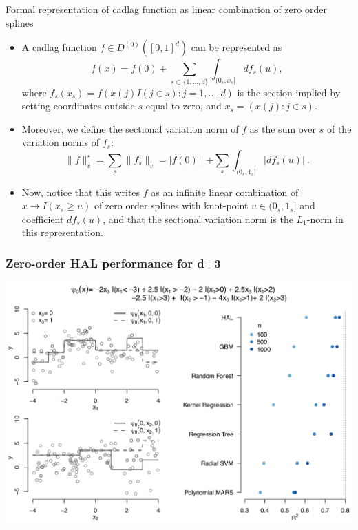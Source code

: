 \documentclass[t]{beamer}
\begin{document}
\begin{frame}{Formal representation of cadlag function as linear combination of zero order splines}
\begin{itemize}
\item A cadlag function $f\in D^{(0)}([0,1]^d)$ can be represented as
\[
f(x)=f(0)+\sum_{s\subset\{1,\ldots,d\}}\int_{(0_s,x_s]}df_s(u),\]
where $f_s(x_s)=f(x(j)I(j\in s): j=1,\ldots,d)$ is the section implied by setting coordinates outside $s$ equal to zero, and $x_s=(x(j): j\in s)$.
\item Moreover, we define the sectional variation norm of $f$ as the sum over $s$ of the variation norms of $f_s$:
\[
\lVert f\rVert_v^{\star}=\sum_s \lVert f_s \rVert_v=\mid f(0)\mid +\sum_s
\int_{(0_s,1_s]}\lvert df_s(u)\rvert \ .
\]
\end{itemize}
\end{frame}
\begin{frame}
\begin{itemize}
\item Now, notice that this writes $f$ as an infinite linear combination of $x\rightarrow I(x_s\geq u)$ of zero order splines with knot-point $u\in (0_s,1_s]$ and coefficient $df_s(u)$, and that the sectional variation norm is the $L_1$-norm in this representation.
\end{itemize}
\end{frame}

\begin{frame}
\frametitle{Zero-order HAL performance for d=3}
  \vspace{-10pt}
  \begin{center}
  \includegraphics[width = 1\textwidth]{figures/HALworks.png}
  \end{center}
\end{frame}
\end{document}
